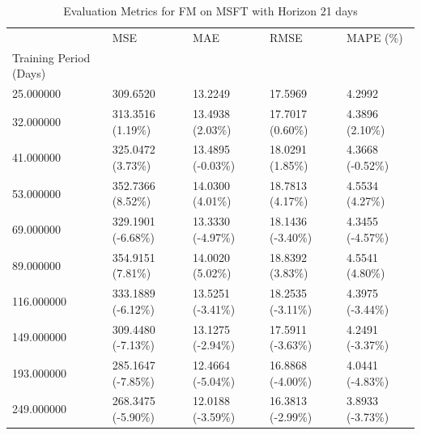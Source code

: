 \begin{table}
\caption{Evaluation Metrics for FM on MSFT with Horizon 21 days}
\label{tab:fm_MSFT_h21_metrics}
\begin{tabular}{lllll}
\toprule
 & MSE & MAE & RMSE & MAPE (\%) \\
Training Period (Days) &  &  &  &  \\
\midrule
25.000000 & 309.6520 & 13.2249 & 17.5969 & 4.2992 \\
32.000000 & 313.3516 (1.19\%) & 13.4938 (2.03\%) & 17.7017 (0.60\%) & 4.3896 (2.10\%) \\
41.000000 & 325.0472 (3.73\%) & 13.4895 (-0.03\%) & 18.0291 (1.85\%) & 4.3668 (-0.52\%) \\
53.000000 & 352.7366 (8.52\%) & 14.0300 (4.01\%) & 18.7813 (4.17\%) & 4.5534 (4.27\%) \\
69.000000 & 329.1901 (-6.68\%) & 13.3330 (-4.97\%) & 18.1436 (-3.40\%) & 4.3455 (-4.57\%) \\
89.000000 & 354.9151 (7.81\%) & 14.0020 (5.02\%) & 18.8392 (3.83\%) & 4.5541 (4.80\%) \\
116.000000 & 333.1889 (-6.12\%) & 13.5251 (-3.41\%) & 18.2535 (-3.11\%) & 4.3975 (-3.44\%) \\
149.000000 & 309.4480 (-7.13\%) & 13.1275 (-2.94\%) & 17.5911 (-3.63\%) & 4.2491 (-3.37\%) \\
193.000000 & 285.1647 (-7.85\%) & 12.4664 (-5.04\%) & 16.8868 (-4.00\%) & 4.0441 (-4.83\%) \\
249.000000 & 268.3475 (-5.90\%) & 12.0188 (-3.59\%) & 16.3813 (-2.99\%) & 3.8933 (-3.73\%) \\
\bottomrule
\end{tabular}
\end{table}
